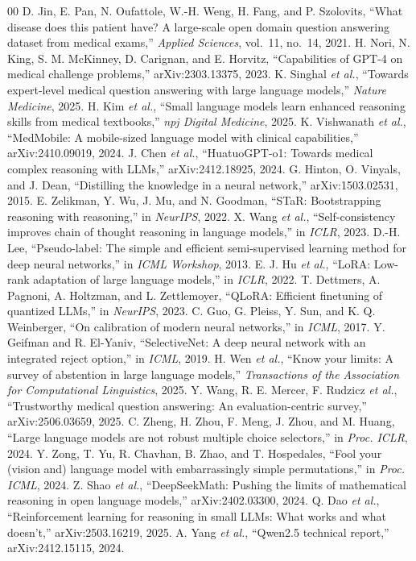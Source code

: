 \documentclass[conference]{IEEEtran}
\begin{document}
\begin{thebibliography}{00}
 D. Jin, E. Pan, N. Oufattole, W.-H. Weng, H. Fang, and P. Szolovits, ``What disease does this patient have? A large-scale open domain question answering dataset from medical exams,'' \emph{Applied Sciences}, vol.~11, no.~14, 2021.
 H. Nori, N. King, S. M. McKinney, D. Carignan, and E. Horvitz, ``Capabilities of GPT-4 on medical challenge problems,'' arXiv:2303.13375, 2023.
 K. Singhal \emph{et al.}, ``Towards expert-level medical question answering with large language models,'' \emph{Nature Medicine}, 2025.
 H. Kim \emph{et al.}, ``Small language models learn enhanced reasoning skills from medical textbooks,'' \emph{npj Digital Medicine}, 2025.
 K. Vishwanath \emph{et al.}, ``MedMobile: A mobile-sized language model with clinical capabilities,'' arXiv:2410.09019, 2024.
 J. Chen \emph{et al.}, ``HuatuoGPT-o1: Towards medical complex reasoning with LLMs,'' arXiv:2412.18925, 2024.
 G. Hinton, O. Vinyals, and J. Dean, ``Distilling the knowledge in a neural network,'' arXiv:1503.02531, 2015.
 E. Zelikman, Y. Wu, J. Mu, and N. Goodman, ``STaR: Bootstrapping reasoning with reasoning,'' in \emph{NeurIPS}, 2022.
 X. Wang \emph{et al.}, ``Self-consistency improves chain of thought reasoning in language models,'' in \emph{ICLR}, 2023.
 D.-H. Lee, ``Pseudo-label: The simple and efficient semi-supervised learning method for deep neural networks,'' in \emph{ICML Workshop}, 2013.
 E. J. Hu \emph{et al.}, ``LoRA: Low-rank adaptation of large language models,'' in \emph{ICLR}, 2022.
 T. Dettmers, A. Pagnoni, A. Holtzman, and L. Zettlemoyer, ``QLoRA: Efficient finetuning of quantized LLMs,'' in \emph{NeurIPS}, 2023.
 C. Guo, G. Pleiss, Y. Sun, and K. Q. Weinberger, ``On calibration of modern neural networks,'' in \emph{ICML}, 2017.
 Y. Geifman and R. El-Yaniv, ``SelectiveNet: A deep neural network with an integrated reject option,'' in \emph{ICML}, 2019.
 H. Wen \emph{et al.}, ``Know your limits: A survey of abstention in large language models,'' \emph{Transactions of the Association for Computational Linguistics}, 2025.
 Y. Wang, R. E. Mercer, F. Rudzicz \emph{et al.}, ``Trustworthy medical question answering: An evaluation-centric survey,'' arXiv:2506.03659, 2025.
 C. Zheng, H. Zhou, F. Meng, J. Zhou, and M. Huang, ``Large language models are not robust multiple choice selectors,'' in \emph{Proc. ICLR}, 2024.
 Y. Zong, T. Yu, R. Chavhan, B. Zhao, and T. Hospedales, ``Fool your (vision and) language model with embarrassingly simple permutations,'' in \emph{Proc. ICML}, 2024.
 Z. Shao \emph{et al.}, ``DeepSeekMath: Pushing the limits of mathematical reasoning in open language models,'' arXiv:2402.03300, 2024.
 Q. Dao \emph{et al.}, ``Reinforcement learning for reasoning in small LLMs: What works and what doesn't,'' arXiv:2503.16219, 2025.
 A. Yang \emph{et al.}, ``Qwen2.5 technical report,'' arXiv:2412.15115, 2024.
\end{thebibliography}
\end{document}
